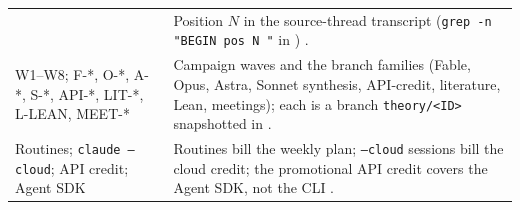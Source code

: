 {\begin{xltabular}{\textwidth}{@{}>{\raggedright\arraybackslash}p{4.4cm}>{\raggedright\arraybackslash}X@{}}
 & Position $N$ in the source-thread transcript (\texttt{grep -n "BEGIN pos N "} in ) . \\
W1--W8; F-*, O-*, A-*, S-*, API-*, LIT-*, L-LEAN, MEET-* & Campaign waves and the branch families (Fable, Opus, Astra, Sonnet synthesis, API-credit, literature, Lean, meetings); each is a branch \texttt{theory/<ID>} snapshotted in  . \\
Routines; \texttt{claude --cloud}; API credit; Agent SDK & Routines bill the weekly plan; \texttt{--cloud} sessions bill the cloud credit; the promotional API credit covers the Agent SDK, not the CLI . \\
\bottomrule
\end{xltabular}
}
